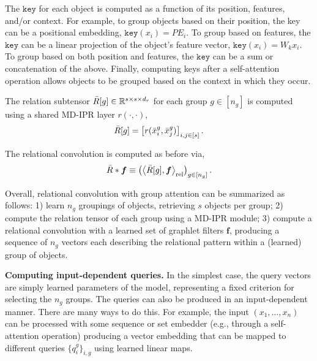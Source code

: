 The $\mathtt{key}$ for each object is computed as a function of its position, features, and/or context. For example, to group objects based on their position, the key can be a positional embedding, $\mathtt{key}(x_i) = PE_i$. To group based on features, the $\mathtt{key}$ can be a linear projection of the object's feature vector, $\mathtt{key}(x_i) = W_k x_i$. To group based on both position and features, the $\mathtt{key}$ can be a sum or concatenation of the above. Finally, computing keys after a self-attention operation allows objects to be grouped based on the context in which they occur.

The relation subtensor $\bar{R}[g] \in \mathbb{R}^{s \times s \times d_r}$ for each group $g \in [n_g]$ is computed using a shared MD-IPR layer $r(\cdot, \cdot)$,
\begin{equation}\label{eq:group_attn_relsubtensor}
    \bar{R}[g] = \left[r(\bar{x}_{i}^{g}, \bar{x}_{j}^{g})\right]_{i,j \in [s]}.
\end{equation}

The relational convolution is computed as before via,
\begin{equation}\label{eq:relconv_groupattn}
    \bar{R} \ast \bm{f} \equiv \left(\left\langle \bar{R}[g], \bm{f} \right\rangle_\mathrm{rel}\right)_{g \in [n_g]}.
\end{equation}

Overall, relational convolution with group attention can be summarized as follows: 1) learn $n_g$ groupings of objects, retrieving $s$ objects per group; 2) compute the relation tensor of each group using a MD-IPR module; 3) compute a relational convolution with a learned set of graphlet filters $\bm{f}$, producing a sequence of $n_g$ vectors each describing the relational pattern within a (learned) group of objects.

\textbf{Computing input-dependent queries.} In the simplest case, the query vectors are simply learned parameters of the model, representing a fixed criterion for selecting the $n_g$ groups. The queries can also be produced in an input-dependent manner. There are many ways to do this. For example, the input $(x_1, \ldots, x_n)$ can be processed with some sequence or set embedder (e.g., through a self-attention operation) producing a vector embedding that can be mapped to different queries $\{q_{i}^g\}_{i,g}$ using learned linear maps.

